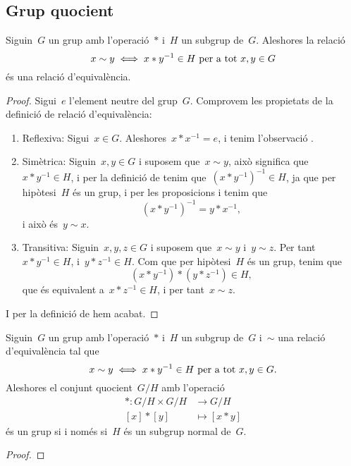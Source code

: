 \documentclass[../../Main.tex]{subfiles}
\begin{document}
	\subsection{Grup quocient}
	\begin{proposition}
		\label{prop:relacio entre grups és d'equivalència}
		\label{TODO:grup quocient}
		Siguin~\(G\) un grup amb l'operació~\(\ast\) i~\(H\) un subgrup de~\(G\).
		Aleshores la relació
		\[
		    x\sim y\iff x\ast y^{-1}\in H\text{ per a tot }x,y\in G
		\]
		és una relació d'equivalència.
		\begin{proof}
			Sigui~\(e\) l'element neutre del grup~\(G\).
			Comprovem les propietats de la definició de relació d'equivalència:
			\begin{enumerate}
				\item Reflexiva: Sigui~\(x\in G\).
				Aleshores~\(x\ast x^{-1}=e\), i tenim l'observació .
				\item Simètrica: Siguin~\(x,y\in G\) i suposem que~\(x\sim y\), això significa que~\(x\ast y^{-1}\in H\), i per la definició de  tenim que~\((x\ast y^{-1})^{-1}\in H\), ja que per hipòtesi~\(H\) és un grup, i per les proposicions  i  tenim que
				\[
				    (x\ast y^{-1})^{-1}=y\ast x^{-1},
				\]
				i això és~\(y\sim x\).
				\item Transitiva: Siguin~\(x,y,z\in G\) i suposem que~\(x\sim y\) i~\(y\sim z\).
				Per tant~\(x\ast y^{-1}\in H\), i~\(y\ast z^{-1}\in H\).
				Com que per hipòtesi~\(H\) és un grup, tenim que
				\[
				    (x\ast y^{-1})\ast(y\ast z^{-1})\in H,
				\]
				que és equivalent a~\(x\ast z^{-1}\in H\), i per tant~\(x\sim z\).
			\end{enumerate}
			I per la definició de  hem acabat.
		\end{proof}
	\end{proposition}
	\begin{proposition}\label{prop:grup quocient}
		Siguin~\(G\) un grup amb l'operació~\(\ast\) i~\(H\) un subgrup de~\(G\) i~\(\sim\) una relació d'equivalència tal que
		\[
		    x\sim y\iff x\ast y^{-1}\in H\text{ per a tot }x,y\in G.
		\]
		Aleshores el conjunt quocient~\(G/H\) amb l'operació
		\begin{align*}
		\ast\colon G/H\times G/H&\longrightarrow G/H\\
		[x]\ast[y]&\longmapsto[x\ast y]
		\end{align*}
		és un grup si i només si~\(H\) és un subgrup normal de~\(G\).
		\begin{proof}
		\end{proof}
	\end{proposition}
\end{document}
